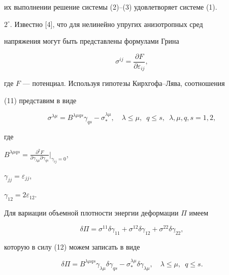 их выполнении решение системы (2)--(3) удовлетворяет системе (1). 


\medskip 


 


$2^\circ$. Известно [4], что для нелинейно упругих анизотропных сред 


напряжения могут быть представлены формулами Грина 


\begin{equation} 


\sigma^{ij}=\frac{\partial F}{\partial\varepsilon_{ij}}, 


\end{equation} 


где $F$ --- потенциал. Используя гипотезы Кирхгофа--Лява, соотношения 


(11) представим в виде 


\begin{equation} 


\sigma^{\lambda\mu}=B^{\lambda\mu qs}\gamma_{qs}


-\sigma^{\lambda\mu}_*, 


\quad \lambda\le\mu,\ \;q\le s,\ \; 


\lambda,\mu,q,s=1,2, 


\end{equation} 


где 


$B^{\lambda\mu qs}= 


\frac{\partial^2F}{\partial\gamma_{\lambda\mu} 


\partial\gamma_{qs}}\big|_{\gamma_{ij}=0}$, 


$\gamma_{jj}=\varepsilon_{jj}$, 


$\gamma_{12}=2\varepsilon_{12}$. 


 


Для вариации объемной плотности энергии деформации $\Pi$ имеем 


$$ 


\delta\Pi=\sigma^{11}\delta\gamma_{11}+\sigma^{12}\delta\gamma_{12}+ 


\sigma^{22}\delta\gamma_{22}, 


$$ 


которую в силу (12) можем записать в виде 


\begin{equation} 


\delta\Pi=B^{\lambda\mu qs}\gamma_{\lambda\mu}\delta\gamma_{qs}- 


\sigma^{\lambda\mu}_*\delta\gamma_{\lambda\mu},\quad 


\lambda\le\mu,\ \; q\le s. 


\end{equation} 


